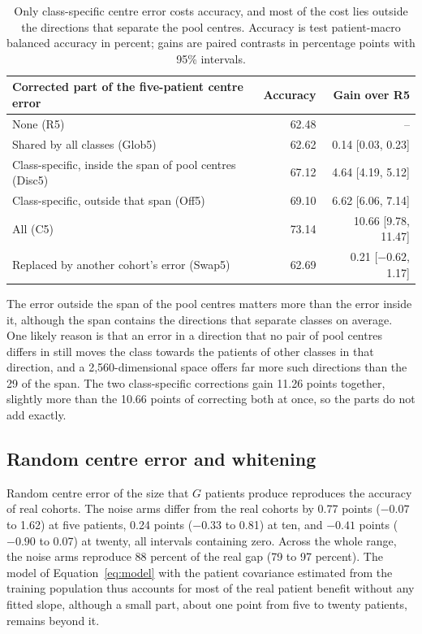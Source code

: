 \documentclass[11pt]{article}
\begin{document}
\begin{table}[htbp]
\centering
\renewcommand{\arraystretch}{1.15}
\begin{tabular}{@{}lrr@{}}
\toprule
Corrected part of the five-patient centre error & Accuracy & Gain over R5 \\
\midrule
None (R5) & 62.48 & -- \\
Shared by all classes (Glob5) & 62.62 & 0.14 [0.03, 0.23] \\
Class-specific, inside the span of pool centres (Disc5) & 67.12 & 4.64 [4.19, 5.12] \\
Class-specific, outside that span (Off5) & 69.10 & 6.62 [6.06, 7.14] \\
All (C5) & 73.14 & 10.66 [9.78, 11.47] \\
\addlinespace
Replaced by another cohort's error (Swap5) & 62.69 & 0.21 [$-0.62$, 1.17] \\
\bottomrule
\end{tabular}
\caption{Only class-specific centre error costs accuracy, and most of the cost lies outside the directions that separate the pool centres. Accuracy is test patient-macro balanced accuracy in percent; gains are paired contrasts in percentage points with 95\% intervals.}
\label{tab:parts}
\end{table}

\noindent The error outside the span of the pool centres matters more than the error inside it, although the span contains the directions that separate classes on average. One likely reason is that an error in a direction that no pair of pool centres differs in still moves the class towards the patients of other classes in that direction, and a 2,560-dimensional space offers far more such directions than the 29 of the span. The two class-specific corrections gain 11.26 points together, slightly more than the 10.66 points of correcting both at once, so the parts do not add exactly.

\subsection{Random centre error and whitening}
\label{sec:noise-results}
Random centre error of the size that $G$ patients produce reproduces the accuracy of real cohorts. The noise arms differ from the real cohorts by 0.77 points ($-0.07$ to 1.62) at five patients, 0.24 points ($-0.33$ to 0.81) at ten, and $-0.41$ points ($-0.90$ to 0.07) at twenty, all intervals containing zero. Across the whole range, the noise arms reproduce 88 percent of the real gap (79 to 97 percent). The model of Equation~\ref{eq:model} with the patient covariance estimated from the training population thus accounts for most of the real patient benefit without any fitted slope, although a small part, about one point from five to twenty patients, remains beyond it.
\end{document}
